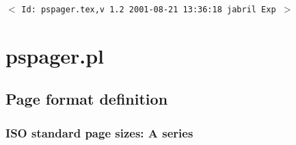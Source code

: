 \documentclass[11pt]{article}
\newcommand{\sctn}[1]{\section{#1}}
\newcommand{\subsctn}[1]{\subsection{#1}}
\newcommand{\subsubsctn}[1]{\subsubsection{#1}}
\begin{document}

\newpage
{}
\setcounter{page}{1}
\pagestyle{fancy}
\renewcommand{\sectionmark}[1]{\markboth{}{\thesection.\ #1}}
\renewcommand{\subsectionmark}[1]{\markboth{}{\thesubsection.\ \textsl{#1}}}

\tableofcontents
\listoftables
\listoffigures

\vfill
\begin{center}
{\small$<$ \verb$Id: pspager.tex,v 1.2 2001-08-21 13:36:18 jabril Exp $$>$ }
\end{center}


\newpage
{}
\setcounter{page}{1}

\sctn{pspager.pl}

\subsctn{Page format definition} %
\label{sec:PAGEdef}

\subsubsctn{ISO standard page sizes: A series}
\end{document}
